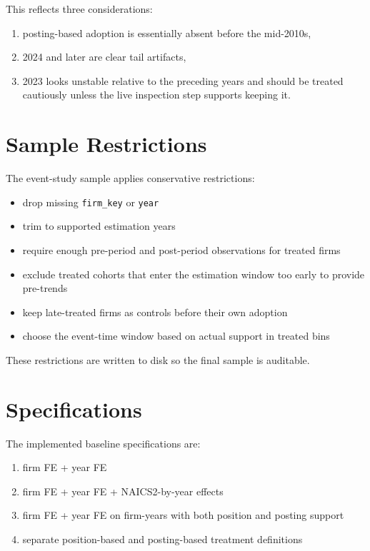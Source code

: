 \documentclass[11pt]{article}
\begin{document}
This reflects three considerations:

\begin{enumerate}[leftmargin=1.5em]
    \item posting-based adoption is essentially absent before the mid-2010s,
    \item 2024 and later are clear tail artifacts,
    \item 2023 looks unstable relative to the preceding years and should be treated cautiously unless the live inspection step supports keeping it.
\end{enumerate}

\section*{Sample Restrictions}

The event-study sample applies conservative restrictions:

\begin{itemize}[leftmargin=1.5em]
    \item drop missing \texttt{firm\_key} or \texttt{year}
    \item trim to supported estimation years
    \item require enough pre-period and post-period observations for treated firms
    \item exclude treated cohorts that enter the estimation window too early to provide pre-trends
    \item keep late-treated firms as controls before their own adoption
    \item choose the event-time window based on actual support in treated bins
\end{itemize}

These restrictions are written to disk so the final sample is auditable.

\section*{Specifications}

The implemented baseline specifications are:

\begin{enumerate}[leftmargin=1.5em]
    \item firm FE + year FE
    \item firm FE + year FE + NAICS2-by-year effects
    \item firm FE + year FE on firm-years with both position and posting support
    \item separate position-based and posting-based treatment definitions
\end{enumerate}
\end{document}
